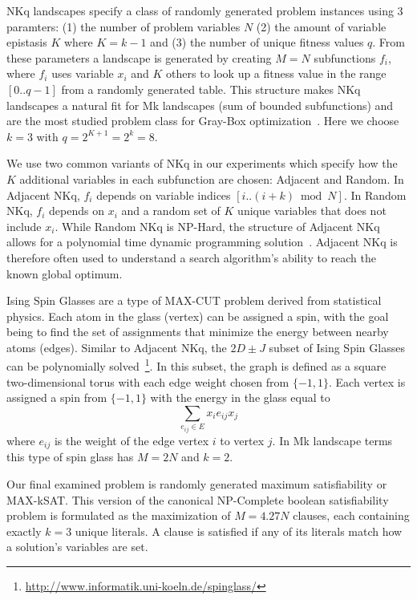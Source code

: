 \documentclass[runningheads,a4paper]{llncs}
\begin{document}
NKq landscapes specify a class of randomly generated problem instances using 3 paramters:
(1) the number of problem variables $N$ (2) the amount of variable epistasis $K$ where $K=k-1$
and (3) the number of unique fitness values $q$. From these parameters a landscape is generated
by creating $M=N$ subfunctions $f_i$, where $f_i$ uses variable $x_i$ and $K$ others to look up
a fitness value in the range $[0..q-1]$ from a randomly generated table. This structure
makes NKq landscapes a natural fit for Mk landscapes (sum of bounded subfunctions)
and are the most studied problem class for Gray-Box
optimization~\cite{whitley:2012:constant,chicano:2014:ball,goldman:2015:GBO,tintos:2015:partitioncross,ochoa:2015:crossovernetworks,whitley:2015:mk}.
Here we choose $k=3$ with $q=2^{K+1}=2^{k}=8$.

We use two common variants of NKq in our experiments which specify how the $K$ additional
variables in each subfunction are chosen: Adjacent and Random. In Adjacent NKq, $f_i$ depends
on variable indices $[i..(i+k) \bmod N]$. In Random NKq, $f_i$ depends on $x_i$ and a random
set of $K$ unique variables that does not include $x_i$. While Random NKq is NP-Hard,
the structure of Adjacent NKq allows for a polynomial time dynamic programming solution~\cite{wright:2000:solvingnk}.
Adjacent NKq is therefore often used to understand a search algorithm's ability to reach the known global
optimum.

Ising Spin Glasses are a type of MAX-CUT problem derived from statistical physics.
Each atom in the glass (vertex) can be assigned a spin, with the goal being to
find the set of assignments that minimize the energy between nearby atoms (edges).
Similar to Adjacent NKq, the $2D\pm J$ subset of Ising Spin Glasses can be polynomially
solved~\cite{saul:1994:spinglass}\footnote{\url{http://www.informatik.uni-koeln.de/spinglass/}}.
In this subset, the graph is defined as a square two-dimensional torus with each edge
weight chosen from $\{-1, 1\}$. Each vertex is assigned a spin from $\{-1, 1\}$ with
the energy in the glass equal to
\begin{equation}
\sum_{e_{ij} \in E} x_ie_{ij}x_j
  \label{eq-ising}
\end{equation}
where $e_{ij}$ is the weight of the edge vertex $i$ to vertex $j$. In Mk landscape terms
this type of spin glass has $M=2N$ and $k=2$.

Our final examined problem is randomly generated maximum satisfiability or MAX-kSAT.
This version of the canonical NP-Complete boolean satisfiability problem is formulated
as the maximization of $M=4.27N$ clauses, each containing exactly $k=3$ unique literals.
A clause is satisfied if any of its literals match how a solution's variables are set.
\end{document}
